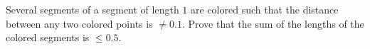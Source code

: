 Several segments of a segment of length $1$ are colored such that the distance between any two colored points is $\neq 0.1$. Prove that the sum of the lengths of the colored segments is $\leq 0.5$.
